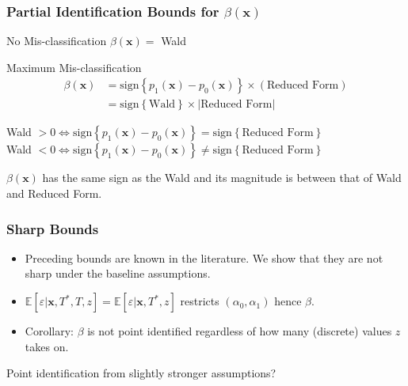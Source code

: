 \documentclass{beamer}
\begin{document}
\begin{frame}
  \frametitle{Partial Identification Bounds for $\beta(\mathbf{x})$}

    \begin{block}{No Mis-classification}
      $\beta(\mathbf{x}) = $ Wald 
    \end{block}

    \begin{block}{Maximum Mis-classification}
      \vspace{-1.5em}
      \begin{align*}
        \beta(\mathbf{x}) &=\mbox{sign}\left\{ p_1(\mathbf{x}) - p_0(\mathbf{x}) \right\}\times (\mbox{Reduced Form})\\
        &=\mbox{sign}\left\{ \mbox{Wald} \right\} \times |\mbox{Reduced Form}|
      \end{align*}
      
      \vspace{1em}
    \footnotesize Wald $> 0\iff \mbox{sign}\left\{ p_1(\mathbf{x}) - p_0(\mathbf{x}) \right\} = \mbox{sign}\left\{ \mbox{Reduced Form} \right\}$ \\
    \footnotesize Wald $< 0\iff \mbox{sign}\left\{ p_1(\mathbf{x}) - p_0(\mathbf{x}) \right\} \neq \mbox{sign}\left\{ \mbox{Reduced Form} \right\}$ 
    \end{block}

    \vspace{1em}
    \begin{alertblock}{
        $\beta(\mathbf{x})$ has the same sign as the Wald and its magnitude is between that of Wald and Reduced Form.}
    \end{alertblock}

\end{frame}
\begin{frame}[label=SHARP_BODY]
  \frametitle{Sharp Bounds}

  \begin{itemize}
    \item Preceding bounds are known in the literature. We show that they are not sharp under the baseline assumptions.
      \item $\mathbb{E}[\varepsilon|\mathbf{x},T^*,T,z] = \mathbb{E}[\varepsilon|\mathbf{x},T^*,z]$ restricts $(\alpha_0,\alpha_1)$ hence $\beta$.
      \hyperlink{SHARP_APPEND}{}
    \item Corollary: $\beta$ is not point identified regardless of how many (discrete) values $z$ takes on.
  \end{itemize}

  \begin{alertblock}{Point identification from slightly stronger assumptions?}
  \end{alertblock}

\end{frame}
\end{document}
